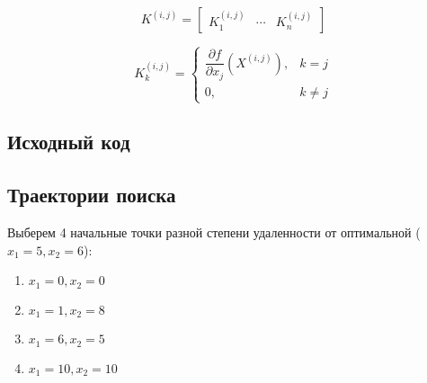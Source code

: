 \begin{equation*}
K^{(i,j)} = \begin{bmatrix} K_1^{(i,j)} & \cdots & K_n^{(i,j)} \end{bmatrix}
\end{equation*}

\begin{equation*}
K_k^{(i,j)} = 
\begin{cases}
\dfrac{\partial f}{\partial x_j}\left( X^{(i,j)} \right), &k = j\\
0, &k \neq j
\end{cases}
\end{equation*}

\newpage

\subsection{Исходный код}



\subsection{Траектории поиска}

Выберем 4 начальные точки разной степени удаленности от оптимальной ($x_1 = 5, x_2 = 6$): 
\begin{multicols}{2} 
\begin{enumerate}
	\setlength{\itemsep}{0em}
	\item $x_1 = 0, x_2 = 0$
	\item $x_1 = 1, x_2 = 8$
	\item $x_1 = 6, x_2 = 5$
	\item $x_1 = 10, x_2 = 10$
\end{enumerate}
\end{multicols}

